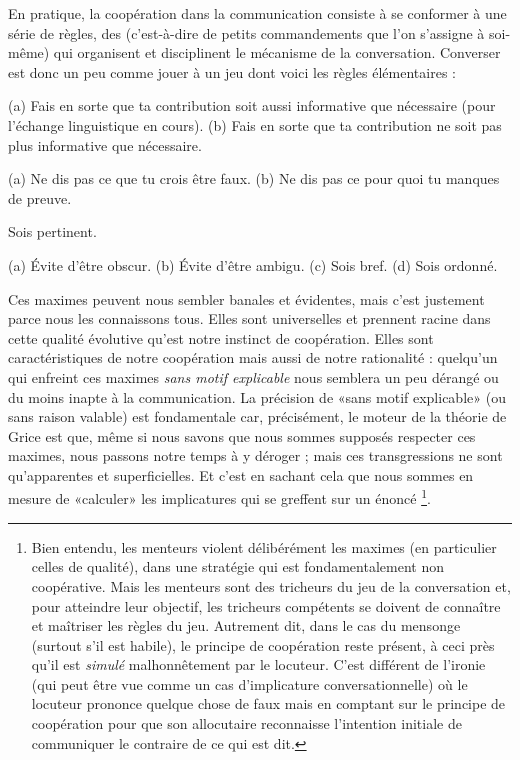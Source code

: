 \begin{refsegment}
En pratique, la coopération dans la communication consiste à se conformer à une série de règles, des  (c'est-à-dire de petits commandements que l'on s'assigne à soi-même) qui organisent et disciplinent le mécanisme de la conversation. Converser est donc un peu comme jouer à un jeu dont voici les règles élémentaires : 

\begin{defi}
\begin{description}[itemsep=0pt]
\item[Quantité :] (a) Fais en sorte que ta contribution soit aussi
informative que nécessaire (pour l'échange linguistique en cours).
(b) Fais en sorte que ta contribution ne soit pas plus informative que
nécessaire. 
\item[Qualité :] (a) Ne dis pas ce que tu crois être faux. (b) Ne dis pas ce
pour quoi tu manques de preuve.
\item[Relation :]  Sois pertinent.  %
\item[Manière :] (a) Évite d'être obscur. (b)  Évite d'être ambigu. (c)
Sois bref. (d) Sois ordonné.
\end{description}
\end{defi}

Ces maximes peuvent nous sembler banales et évidentes, mais c'est justement parce nous les connaissons tous. Elles sont universelles et prennent racine dans cette qualité évolutive qu'est notre instinct de coopération.  Elles sont caractéristiques de notre coopération mais aussi de notre rationalité : quelqu'un qui enfreint ces maximes \emph{sans motif explicable} nous semblera un peu dérangé ou du moins inapte à la communication. %
La précision de «sans motif explicable» (ou sans raison valable) est fondamentale car, précisément, le moteur de la théorie de Grice est que, même si nous savons que nous sommes supposés respecter ces maximes, nous passons notre temps à y déroger ; mais ces transgressions ne sont qu'apparentes et superficielles.  Et c'est en sachant cela que nous sommes en mesure de «calculer» les implicatures qui se greffent sur un énoncé%
\footnote{Bien entendu, les menteurs violent délibérément les maximes (en particulier celles de qualité), dans une stratégie qui est fondamentalement non coopérative. Mais les menteurs sont des tricheurs du jeu de la conversation et, pour atteindre leur objectif, les tricheurs compétents se doivent de connaître et maîtriser les règles du jeu.  Autrement dit, dans le cas du mensonge (surtout s'il est habile), le principe de coopération reste présent, à ceci près qu'il est \emph{simulé} malhonnêtement par le locuteur. C'est différent de l'ironie (qui peut être vue comme un cas d'implicature conversationnelle) où le locuteur prononce quelque chose de faux mais en comptant sur le principe de coopération pour que son allocutaire reconnaisse l'intention initiale de communiquer le contraire de ce qui est dit.}.   




\end{refsegment}

